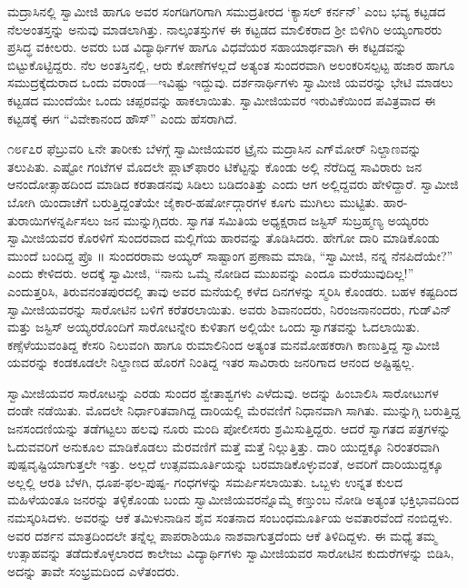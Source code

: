 ಮದ್ರಾಸಿನಲ್ಲಿ ಸ್ವಾಮೀಜಿ ಹಾಗೂ ಅವರ ಸಂಗಡಿಗರಿಗಾಗಿ ಸಮುದ್ರತೀರದ ‘ಕ್ಯಾಸಲ್ ಕರ್ನನ್​’ ಎಂಬ ಭವ್ಯ ಕಟ್ಟಡದ ನೆಲಅಂತಸ್ತನ್ನು ಅನುವು ಮಾಡಲಾಗಿತ್ತು. ನಾಲ್ಕಂತಸ್ತುಗಳ ಈ ಕಟ್ಟಡದ ಮಾಲಿಕರಾದ ಶ್ರೀ ಬಿಳಿಗಿರಿ ಅಯ್ಯಂಗಾರರು ಪ್ರಸಿದ್ಧ ವಕೀಲರು. ಅವರು ಬಡ ವಿದ್ಯಾರ್ಥಿಗಳ ಹಾಗೂ ವಿಧವೆಯರ ಸಹಾಯಾರ್ಥವಾಗಿ ಈ ಕಟ್ಟಡವನ್ನು ಬಿಟ್ಟುಕೊಟ್ಟಿದ್ದರು. ನೆಲ ಅಂತಸ್ತಿನಲ್ಲಿ, ಆರು ಕೋಣೆಗಳಲ್ಲದೆ ಅತ್ಯಂತ ಸುಂದರವಾಗಿ ಅಲಂಕರಿಸಲ್ಪಟ್ಟ ಹಜಾರ ಹಾಗೂ ಸಮುದ್ರಕ್ಕೆದುರಾದ ಒಂದು ವರಾಂಡ—ಇವಿಷ್ಟು ಇದ್ದುವು. ದರ್ಶನಾರ್ಥಿಗಳು ಸ್ವಾಮೀಜಿ ಯವರನ್ನು ಭೇಟಿ ಮಾಡಲು ಕಟ್ಟಡದ ಮುಂದೆಯೇ ಒಂದು ಚಪ್ಪರವನ್ನು ಹಾಕಲಾಯಿತು. ಸ್ವಾಮೀಜಿಯವರ ಇರುವಿಕೆಯಿಂದ ಪವಿತ್ರವಾದ ಈ ಕಟ್ಟಡಕ್ಕೆ ಈಗ “ವಿವೇಕಾನಂದ ಹೌಸ್​” ಎಂದು ಹೆಸರಾಗಿದೆ.

೧೮೯೭ರ ಫೆಬ್ರುವರಿ ೬ನೇ ತಾರೀಕು ಬೆಳಗ್ಗೆ ಸ್ವಾಮೀಜಿಯವರ ಟ್ರೈನು ಮದ್ರಾಸಿನ ಎಗ್​ಮೋರ್ ನಿಲ್ದಾಣವನ್ನು ತಲುಪಿತು. ಎಷ್ಟೋ ಗಂಟೆಗಳ ಮೊದಲೇ ಪ್ಲಾಟ್​ಫಾರಂ ಟಿಕೆಟ್ಟನ್ನು ಕೊಂಡು ಅಲ್ಲಿ ನೆರೆದಿದ್ದ ಸಾವಿರಾರು ಜನ ಆನಂದೋತ್ಸಾಹದಿಂದ ಮಾಡಿದ ಕರತಾಡನವು ಸಿಡಿಲು ಬಡಿದಂತಿತ್ತು ಎಂದು ಆಗ ಅಲ್ಲಿದ್ದವರು ಹೇಳಿದ್ದಾರೆ. ಸ್ವಾಮೀಜಿ ಬೋಗಿ ಯಿಂದಾಚೆಗೆ ಬರುತ್ತಿದ್ದಂತೆಯೇ ಜೈಕಾರ-ಹರ್ಷೋದ್ಗಾರಗಳ ಕೂಗು ಮುಗಿಲು ಮುಟ್ಟಿತು. ಹಾರ-ತುರಾಯಿಗಳನ್ನರ್ಪಿಸಲು ಜನ ಮುನ್ನುಗ್ಗಿದರು. ಸ್ವಾಗತ ಸಮಿತಿಯ ಅಧ್ಯಕ್ಷರಾದ ಜಸ್ಟಿಸ್ ಸುಬ್ರಹ್ಮಣ್ಯ ಅಯ್ಯರರು ಸ್ವಾಮೀಜಿಯವರ ಕೊರಳಿಗೆ ಸುಂದರವಾದ ಮಲ್ಲಿಗೆಯ ಹಾರವನ್ನು ತೊಡಿಸಿದರು. ಹೇಗೋ ದಾರಿ ಮಾಡಿಕೊಂಡು ಮುಂದೆ ಬಂದಿದ್ದ ಪ್ರೊ ॥ ಸುಂದರರಾಮ ಅಯ್ಯರ್ ಸಾಷ್ಟಾಂಗ ಪ್ರಣಾಮ ಮಾಡಿ, “ಸ್ವಾಮೀಜಿ, ನನ್ನ ನೆನಪಿದೆಯೇ?” ಎಂದು ಕೇಳಿದರು. ಅದಕ್ಕೆ ಸ್ವಾಮೀಜಿ, “ನಾನು ಒಮ್ಮೆ ನೋಡಿದ ಮುಖವನ್ನು ಎಂದೂ ಮರೆಯುವುದಿಲ್ಲ!” ಎಂದುತ್ತರಿಸಿ, ತಿರುವನಂತಪುರದಲ್ಲಿ ತಾವು ಅವರ ಮನೆಯಲ್ಲಿ ಕಳೆದ ದಿನಗಳನ್ನು ಸ್ಮರಿಸಿ ಕೊಂಡರು. ಬಹಳ ಕಷ್ಟದಿಂದ ಸ್ವಾಮೀಜಿಯವರನ್ನು ಸಾರೋಟಿನ ಬಳಿಗೆ ಕರೆತರಲಾಯಿತು. ಅವರು ಶಿವಾನಂದರು, ನಿರಂಜನಾನಂದರು, ಗುಡ್​ವಿನ್ ಮತ್ತು ಜಸ್ಟಿಸ್ ಅಯ್ಯರರೊಂದಿಗೆ ಸಾರೋಟನ್ನೇರಿ ಕುಳಿತಾಗ ಅಲ್ಲಿಯೇ ಒಂದು ಸ್ವಾಗತವನ್ನು ಓದಲಾಯಿತು. ಕಣ್ಸೆಳೆಯುವಂತಿದ್ದ ಕೇಸರಿ ನಿಲುವಂಗಿ ಹಾಗೂ ರುಮಾಲಿನಿಂದ ಅತ್ಯಂತ ಮನಮೋಹಕರಾಗಿ ಕಾಣುತ್ತಿದ್ದ ಸ್ವಾಮೀಜಿ ಯವರನ್ನು ಕಂಡಕೂಡಲೇ ನಿಲ್ದಾಣದ ಹೊರಗೆ ನಿಂತಿದ್ದ ಇತರ ಸಾವಿರಾರು ಜನರಿಗಾದ ಆನಂದ ಅಷ್ಟಿಷ್ಟಲ್ಲ.

ಸ್ವಾಮೀಜಿಯವರ ಸಾರೋಟನ್ನು ಎರಡು ಸುಂದರ ಶ್ವೇತಾಶ್ವಗಳು ಎಳೆದುವು. ಅದನ್ನು ಹಿಂಬಾಲಿಸಿ ಸಾರೋಟುಗಳ ದಂಡೇ ನಡೆಯಿತು. ಮೊದಲೇ ನಿರ್ಧಾರಿತವಾಗಿದ್ದ ದಾರಿಯಲ್ಲಿ ಮೆರವಣಿಗೆ ನಿಧಾನವಾಗಿ ಸಾಗಿತು. ಮುನ್ನುಗ್ಗಿ ಬರುತ್ತಿದ್ದ ಜನಸಂದಣಿಯನ್ನು ತಡೆಗಟ್ಟಲು ಹಲವು ನೂರು ಮಂದಿ ಪೋಲೀಸರು ಶ್ರಮಿಸುತ್ತಿದ್ದರು. ಆದರೆ ಸ್ವಾಗತದ ಪತ್ರಗಳನ್ನು ಓದುವವರಿಗೆ ಅನುಕೂಲ ಮಾಡಿಕೊಡಲು ಮೆರವಣಿಗೆ ಮತ್ತೆ ಮತ್ತೆ ನಿಲ್ಲುತ್ತಿತ್ತು. ದಾರಿ ಯುದ್ದಕ್ಕೂ ನಿರಂತರವಾಗಿ ಪುಷ್ಪವೃಷ್ಟಿಯಾಗುತ್ತಲೇ ಇತ್ತು. ಅಲ್ಲದೆ ಉತ್ಸವಮೂರ್ತಿಯನ್ನು ಬರಮಾಡಿಕೊಳ್ಳುವಂತೆ, ಅವರಿಗೆ ದಾರಿಯುದ್ದಕ್ಕೂ ಅಲ್ಲಲ್ಲಿ ಆರತಿ ಬೆಳಗಿ, ಧೂಪ-ಫಲ-ಪುಷ್ಪ- ಗಂಧಗಳನ್ನು ಸಮರ್ಪಿಸಲಾಯಿತು. ಒಬ್ಬಳು ಉನ್ನತ ಕುಲದ ಮಹಿಳೆಯಂತೂ ಜನರನ್ನು ತಳ್ಳಿಕೊಂಡು ಬಂದು ಸ್ವಾಮೀಜಿಯವರನ್ನೊಮ್ಮೆ ಕಣ್ತುಂಬ ನೋಡಿ ಅತ್ಯಂತ ಭಕ್ತಿಭಾವದಿಂದ ನಮಸ್ಕರಿಸಿದಳು. ಅವರನ್ನು ಆಕೆ ತಮಿಳುನಾಡಿನ ಶೈವ ಸಂತನಾದ ಸಂಬಂಧಮೂರ್ತಿಯ ಅವತಾರವೆಂದೆ ನಂಬಿದ್ದಳು. ಅವರ ದರ್ಶನ ಮಾತ್ರದಿಂದಲೇ ತನ್ನೆಲ್ಲ ಪಾಪರಾಶಿಯೂ ನಾಶವಾಗುತ್ತದೆಂದು ಆಕೆ ತಿಳಿದಿದ್ದಳು. ಈ ಮಧ್ಯೆ ತಮ್ಮ ಉತ್ಸಾಹವನ್ನು ತಡೆದುಕೊಳ್ಳಲಾರದ ಕಾಲೇಜು ವಿದ್ಯಾರ್ಥಿಗಳು ಸ್ವಾಮೀಜಿಯವರ ಸಾರೋಟಿನ ಕುದುರೆಗಳನ್ನು ಬಿಡಿಸಿ, ಅದನ್ನು ತಾವೇ ಸಂಭ್ರಮದಿಂದ ಎಳೆತಂದರು.

